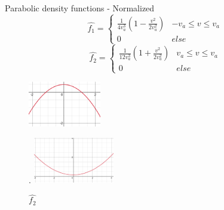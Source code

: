 \documentclass{beamer}
\begin{document}
	\begin{frame}[t]{Parabolic density functions - Normalized}
		\[ \hat{f_{1}} = 
		\begin{cases} 
			\frac{1}{4 v_{a}^{3}} \left(1 - \frac{v^{2}}{2 v_{a}^2}\right) & -v_{a}\leq v\leq v_{a} \\
			0 & else 
		\end{cases}
		\]
		\[ \hat{f_{2}} = 
		\begin{cases}
			\frac{1}{12 v_{a}^{3}} \left(1 + \frac{v^{2}}{2 v_{a}^2}\right) & v_{a}\leq v\leq v_{a} \\
			0 & else
		\end{cases}\]
	
		\begin{multicols}{2}
			
			\begin{figure}[H]
			\includegraphics[width=\columnwidth, height=2cm]{first.png} \caption{$\hat{f_{1}}$} .
			\includegraphics[width=\columnwidth, height=2cm]{second.png} \caption{$\hat{f_{2}}$}
			\end{figure}
		\end{multicols}
	

	\end{frame}
	
\end{document}
